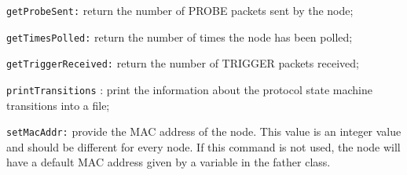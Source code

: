 \begin{description}
\begin{description}
	  \item {\tt getProbeSent:} return the number of PROBE packets sent by the node;
	  \item {\tt getTimesPolled:} return the number of times the node has been polled;
	  \item {\tt getTriggerReceived:} return the number of TRIGGER packets received;
     \item {\tt printTransitions} : print the information about the protocol state machine transitions into a file;
	  \item {\tt setMacAddr:} provide the MAC address of the node. This value is an integer value and should be different for every node. If this command is not used, the node will have a default MAC address given by a variable in the father class.
	   \end{description}


\end{description}
